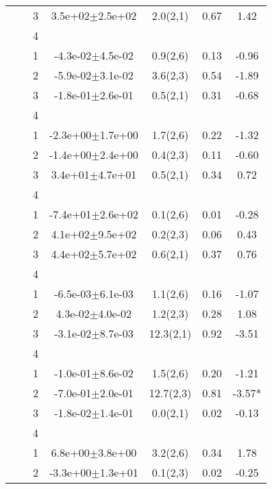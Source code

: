 \begin{longtable}{llccccS[table-format=-2.2, table-space-text-post = {***}]}
   &  & 3 &  3.5e+02$\pm$2.5e+02 & 2.0(2,1) & 0.67 & 1.42 \\ 
   &  & 4 &  &  &  &  \\ 
   \midrule
{} & {} & 1 & -4.3e-02$\pm$4.5e-02 & 0.9(2,6) & 0.13 & -0.96 \\ 
   &  & 2 & -5.9e-02$\pm$3.1e-02 & 3.6(2,3) & 0.54 & -1.89 \\ 
   &  & 3 & -1.8e-01$\pm$2.6e-01 & 0.5(2,1) & 0.31 & -0.68 \\ 
   &  & 4 &  &  &  &  \\ 
   \midrule
{} & {} & 1 & -2.3e+00$\pm$1.7e+00 & 1.7(2,6) & 0.22 & -1.32 \\ 
   &  & 2 & -1.4e+00$\pm$2.4e+00 & 0.4(2,3) & 0.11 & -0.60 \\ 
   &  & 3 &  3.4e+01$\pm$4.7e+01 & 0.5(2,1) & 0.34 & 0.72 \\ 
   &  & 4 &  &  &  &  \\ 
   \midrule
{} & {} & 1 & -7.4e+01$\pm$2.6e+02 & 0.1(2,6) & 0.01 & -0.28 \\ 
   &  & 2 &  4.1e+02$\pm$9.5e+02 & 0.2(2,3) & 0.06 & 0.43 \\ 
   &  & 3 &  4.4e+02$\pm$5.7e+02 & 0.6(2,1) & 0.37 & 0.76 \\ 
   &  & 4 &  &  &  &  \\ 
   \midrule
{} & {} & 1 & -6.5e-03$\pm$6.1e-03 & 1.1(2,6) & 0.16 & -1.07 \\ 
   &  & 2 &  4.3e-02$\pm$4.0e-02 & 1.2(2,3) & 0.28 & 1.08 \\ 
   &  & 3 & -3.1e-02$\pm$8.7e-03 & 12.3(2,1) & 0.92 & -3.51 \\ 
   &  & 4 &  &  &  &  \\ 
   \midrule
{} & {} & 1 & -1.0e-01$\pm$8.6e-02 & 1.5(2,6) & 0.20 & -1.21 \\ 
   &  & 2 & -7.0e-01$\pm$2.0e-01 & 12.7(2,3) & 0.81 & -3.57* \\ 
   &  & 3 & -1.8e-02$\pm$1.4e-01 & 0.0(2,1) & 0.02 & -0.13 \\ 
   &  & 4 &  &  &  &  \\ 
   \midrule
{} & {} & 1 &  6.8e+00$\pm$3.8e+00 & 3.2(2,6) & 0.34 & 1.78 \\ 
   &  & 2 & -3.3e+00$\pm$1.3e+01 & 0.1(2,3) & 0.02 & -0.25 \\ 

\end{longtable}
